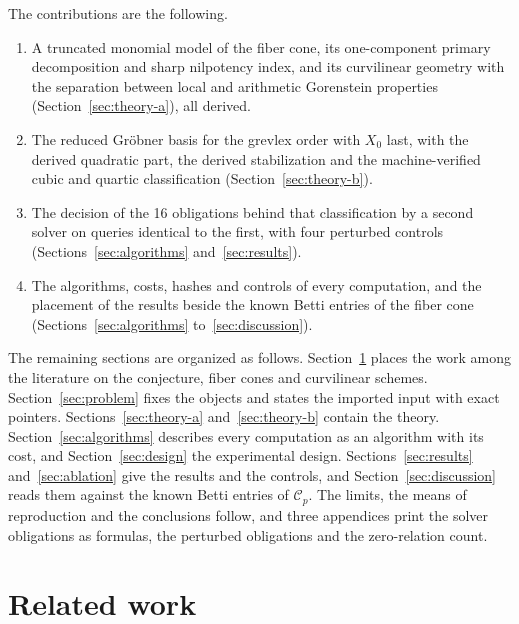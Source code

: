 \documentclass[11pt]{article}
\theoremstyle{definition}
\theoremstyle{remark}
\newcommand{\Cfiber}{\mathcal{C}}
\begin{document}
The contributions are the following.
\begin{enumerate}
\item A truncated monomial model of the fiber cone, its one-component primary decomposition and
sharp nilpotency index, and its curvilinear geometry with the separation between local and
arithmetic Gorenstein properties (Section~\ref{sec:theory-a}), all derived.
\item The reduced Gr\"obner basis for the grevlex order with $X_0$ last, with the derived
quadratic part, the derived stabilization and the machine-verified cubic and quartic classification
(Section~\ref{sec:theory-b}).
\item The decision of the 16 obligations behind that classification by a second solver on
queries identical to the first, with four perturbed controls (Sections~\ref{sec:algorithms}
and~\ref{sec:results}).
\item The algorithms, costs, hashes and controls of every computation, and the placement of the
results beside the known Betti entries of the fiber cone (Sections~\ref{sec:algorithms}
to~\ref{sec:discussion}).
\end{enumerate}

The remaining sections are organized as follows. Section~\ref{sec:related} places the work among
the literature on the conjecture, fiber cones and curvilinear schemes. Section~\ref{sec:problem}
fixes the objects and states the imported input with exact pointers. Sections~\ref{sec:theory-a}
and~\ref{sec:theory-b} contain the theory. Section~\ref{sec:algorithms} describes every
computation as an algorithm with its cost, and Section~\ref{sec:design} the experimental design.
Sections~\ref{sec:results} and~\ref{sec:ablation} give the results and the controls, and
Section~\ref{sec:discussion} reads them against the known Betti entries of $\Cfiber_p$. The
limits, the means of reproduction and the conclusions follow, and three appendices print the
solver obligations as formulas, the perturbed obligations and the zero-relation count.

\section{Related work}\label{sec:related}
\end{document}
